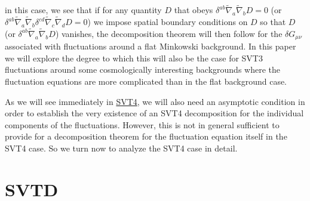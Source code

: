 %
in this case, we see that if for any quantity $D$ that obeys  $\delta^{ab} \tilde{\nabla}_{a}\tilde{\nabla}_{b}D=0$ (or $\delta^{ab} \tilde{\nabla}_{a}\tilde{\nabla}_{b}\delta^{cd} \tilde{\nabla}_{c}\tilde{\nabla}_{d}D=0$) we impose spatial boundary conditions on $D$ so that $D$ (or $\delta^{ab} \tilde{\nabla}_{a}\tilde{\nabla}_{b}D$) vanishes,  the decomposition theorem will then follow for the $\delta G_{\mu\nu}$ associated with fluctuations around a flat Minkowski background. In this paper we will explore the degree to which this will also be the case for SVT3 fluctuations around some cosmologically interesting backgrounds where the fluctuation equations are more complicated than in the flat background case.

As we will see immediately in \hyperref[s:svt4]{SVT4}, we will also need an asymptotic condition in order to establish the very existence of an SVT4 decomposition for the individual components of the fluctuations. However, this is not in general sufficient to provide for a decomposition theorem for the fluctuation equation itself in the SVT4 case. So we turn now to analyze the SVT4 case in detail. 




\section{SVTD}
\label{s:svtd}

